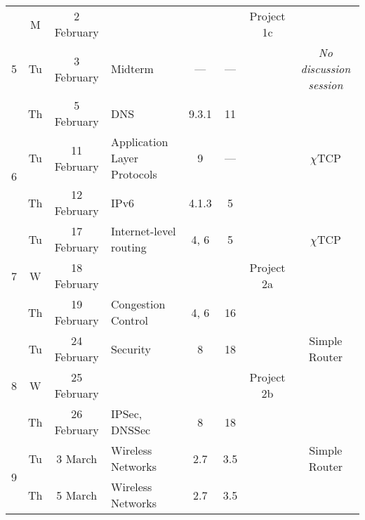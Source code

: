 \documentclass[11pt]{article}
\newcommand{\chitcp}{$\chi$\textsf{TCP}}
\begin{document}
\begin{sidewaystable}
\begin{tabular}{|c|cc||p{6cm}|c|c|c|c|}
\multirow{3}{*}{5}  & M  & 2 February   & \cellcolor[gray]{0.9}  & \cellcolor[gray]{0.9}   & \cellcolor[gray]{0.9}  & Project 1c  & \cellcolor[gray]{0.9} \\\cline{2-6}
                    & Tu & 3 February   & Midterm                                         & ---    & ---  & \cellcolor[gray]{0.9}  & \emph{No discussion session} \\\cline{2-6}
                    & Th & 5 February   & DNS                                             & 9.3.1  & 11   & \cellcolor[gray]{0.9}  & \cellcolor[gray]{0.9} \\\hline\hline

\multirow{2}{*}{6}  & Tu & 11 February  & Application Layer Protocols                     & 9      & ---  & \cellcolor[gray]{0.9}  & \chitcp \\\cline{2-6}
                    & Th & 12 February  & IPv6                                            & 4.1.3  & 5    & \cellcolor[gray]{0.9}  & \cellcolor[gray]{0.9} \\\hline\hline

\multirow{3}{*}{7}  & Tu & 17 February  & Internet-level routing                          & 4, 6   & 5       & \cellcolor[gray]{0.9} & \chitcp \\\cline{2-6}
                    & W  & 18 February  & \cellcolor[gray]{0.9} & \cellcolor[gray]{0.9} & \cellcolor[gray]{0.9} & Project 2a & \cellcolor[gray]{0.9} \\\cline{2-6}
                    & Th & 19 February  & Congestion Control                              & 4, 6   & 16      & \cellcolor[gray]{0.9}  & \cellcolor[gray]{0.9} \\\hline\hline

\multirow{3}{*}{8}  & Tu & 24 February  & Security                                        & 8    & 18      & \cellcolor[gray]{0.9}  & Simple Router \\\cline{2-6}
                    & W  & 25 February  & \cellcolor[gray]{0.9} & \cellcolor[gray]{0.9} & \cellcolor[gray]{0.9} & Project 2b & \cellcolor[gray]{0.9} \\\cline{2-6}
                    & Th & 26 February  & IPSec, DNSSec                                   & 8    & 18      & \cellcolor[gray]{0.9}  & \cellcolor[gray]{0.9} \\\hline\hline

\multirow{2}{*}{9}  & Tu & 3 March      & Wireless Networks                               & 2.7  & 3.5    & \cellcolor[gray]{0.9}  & Simple Router \\\cline{2-6}
                    & Th & 5 March      & Wireless Networks                               & 2.7  & 3.5    & \cellcolor[gray]{0.9}  & \cellcolor[gray]{0.9} \\\hline\hline


\end{tabular}
\end{sidewaystable}
\end{document}
